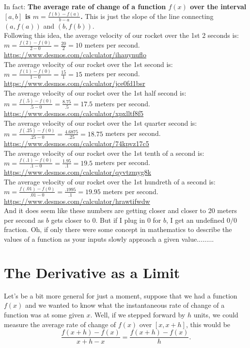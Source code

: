 In fact:  \textbf{ The average rate of change of a function $f(x)$ over the interval $[a,b]$ is $m=\frac{f(b)-f(a)}{b-a}$.}  This is just the slope of the line connecting $(a,f(a))$ and $(b,f(b))$.\\

Following this idea, the average velocity of our rocket over the 1st 2 seconds is: $m=\frac{f(2)-f(0)}{2-0}=\frac{20}{2}=10$ meters per second. \url{https://www.desmos.com/calculator/ihauynuflo}\\

The average velocity of our rocket over the 1st second is: $m=\frac{f(1)-f(0)}{1-0}=\frac{15}{1}=15$ meters per second. \url{https://www.desmos.com/calculator/jce0fd1bsr}\\

The average velocity of our rocket over the 1st half second is: $m=\frac{f(.5)-f(0)}{.5-0}=\frac{8.75}{.5}=17.5$ meters per second. \url{https://www.desmos.com/calculator/xpxlltf8f5}\\

The average velocity of our rocket over the 1st quarter second is: $m=\frac{f(.25)-f(0)}{.25-0}=\frac{4.6875}{.25}=18.75$ meters per second. \url{https://www.desmos.com/calculator/74kpvz17c5}\\

The average velocity of our rocket over the 1st tenth of a second is: $m=\frac{f(.1)-f(0)}{.1-0}=\frac{1.95}{.1}=19.5$ meters per second. \url{https://www.desmos.com/calculator/qyvtzmyg8k}\\

The average velocity of our rocket over the 1st hundreth of a second is: $m=\frac{f(.01)-f(0)}{.01-0}=\frac{.1995}{.1}=19.95$ meters per second. \url{https://www.desmos.com/calculator/hrawtifwdw}\\


And it does seem like these numbers are getting closer and closer to 20 meters per second as $b$ gets closer to 0.  But if I plug in $0$ for $b$, I get an undefined $0/0$ fraction.  Oh, if only there were some concept in mathematics to describe the values of a function as your inputs slowly approach a given value.........

\section{The Derivative as a Limit}\label{Section:DefofDerivative}

Let's be a bit more general for just a moment, suppose that we had a function $f(x)$ and we wanted to know what the instantaneous rate of change of a function was at some given $x$.  Well, if we stepped forward by $h$ units, we could measure the average rate of change of $f(x)$ over $[x, x+h]$, this would be $$\frac{f(x+h)-f(x)}{x+h-x}=\frac{f(x+h)-f(x)}{h}.$$

